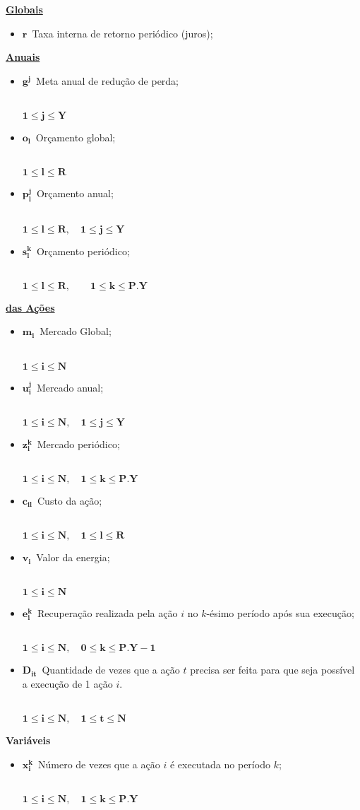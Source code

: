 \documentclass{article}
\newcommand{\topico}[1]{
  \vspace{20pt}
  {\Large \bf #1 }
}
\newcommand{\subtopico}[1]{
  {\large \bf \underline{#1}}
  \\
}
\newcommand{\variavel}[1]{
  { \Large $ \bm{ #1 } \, $}
}
\newcommand{\decorator}[1]{
  {\\ \scriptsize \hspace*{12pt} $ \bm{ #1 } $ }
}
\begin{document}
\begin{multicols}{2}

\subtopico{Globais}
\begin{itemize}
  \item \variavel{r} Taxa interna de retorno periódico (juros);
\end{itemize}

\subtopico{Anuais}
\begin{itemize}
  \item \variavel{g^j} Meta anual de redução de perda;
    \decorator{1 \leq j \leq Y}
  \item \variavel{o_l} Orçamento global;
    \decorator{1 \leq l \leq R}
  \item \variavel{p_l^j} Orçamento anual;
    \decorator{1 \leq l \leq R, \quad 1 \leq j \leq Y}
  \item \variavel{s_l^{k}} Orçamento periódico;
    \decorator{1 \leq l \leq R, \quad \quad 1 \leq k \leq P.Y}
\end{itemize}

\vfill \columnbreak

\subtopico{das Ações}
\begin{itemize}
  \item \variavel{m_i} Mercado Global;
    \decorator{1 \leq i \leq N}
  \item \variavel{u_i^j} Mercado anual;
    \decorator{1 \leq i \leq N, \quad 1 \leq j \leq Y}
  \item \variavel{z_i^k} Mercado periódico;
    \decorator{1 \leq i \leq N, \quad 1 \leq k \leq P.Y}
  \item \variavel{c_{il}} Custo da ação;
    \decorator{1 \leq i \leq N, \quad 1 \leq l \leq R}
  \item \variavel{v_i} Valor da energia;
    \decorator{1 \leq i \leq N}
  \item \variavel{e_i^k} Recuperação realizada pela ação $i$ no $k$-ésimo período
    após sua execução;
    \decorator{1 \leq i \leq N, \quad 0 \leq k \leq P.Y-1}
  \item \variavel{D_{it}} Quantidade de vezes que a ação $t$ precisa ser
  	feita para que seja possível a execução de 1 ação $i$.
    \decorator{1 \leq i \leq N, \quad 1 \leq t \leq N}
\end{itemize}

\end{multicols}

\pagebreak

\topico{Variáveis}
\begin{itemize}
  \item \variavel{x_i^k} Número de vezes que a ação $i$ é executada no período $k$;
    \decorator{1 \leq i \leq N, \quad 1 \leq k \leq P.Y}
\end{itemize}
\end{document}
